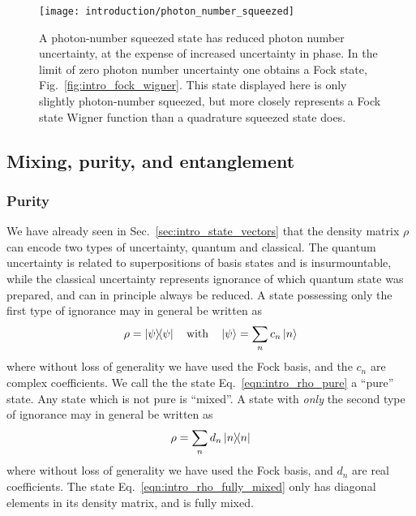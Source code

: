 \begin{figure}[htp]
\centering
\captionsetup{width=0.8\linewidth}
\texttt{[image: introduction/photon\_number\_squeezed]}
\caption{\label{fig:intro_photon_number_squeezed_wigner} A photon-number squeezed state has reduced photon number uncertainty, at the expense of increased uncertainty in phase. In the limit of zero photon number uncertainty one obtains a Fock state, Fig.~\ref{fig:intro_fock_wigner}. This state displayed here is only slightly photon-number squeezed, but more closely represents a Fock state Wigner function than a quadrature squeezed state does. }
\end{figure}



\FloatBarrier
\subsection{Mixing, purity, and entanglement}

\subsubsection{Purity}
We have already seen in Sec.~\ref{sec:intro_state_vectors} that the density matrix $\rho$ can encode two types of uncertainty, quantum and classical. The quantum uncertainty is related to superpositions of basis states and is insurmountable, while the classical uncertainty represents ignorance of which quantum state was prepared, and can in principle always be reduced. A state possessing only the first type of ignorance may in general be written as
\begin{equation}\label{eqn:intro_rho_pure}
\rho = \dyad{\psi} \qq{with} \ket{\psi} = \sum_n c_n \ket{n}
\end{equation}
where without loss of generality we have used the Fock basis, and the $c_n$ are complex coefficients. We call the the state Eq.~\ref{eqn:intro_rho_pure} a ``pure'' state. Any state which is not pure is ``mixed''. A state with \emph{only} the second type of ignorance may in general be written as
\begin{equation}\label{eqn:intro_rho_fully_mixed}
\rho = \sum_n d_n \dyad{n}
\end{equation}
where without loss of generality we have used the Fock basis, and $d_n$ are real coefficients. The state Eq.~\ref{eqn:intro_rho_fully_mixed} only has diagonal elements in its density matrix, and is fully mixed.

